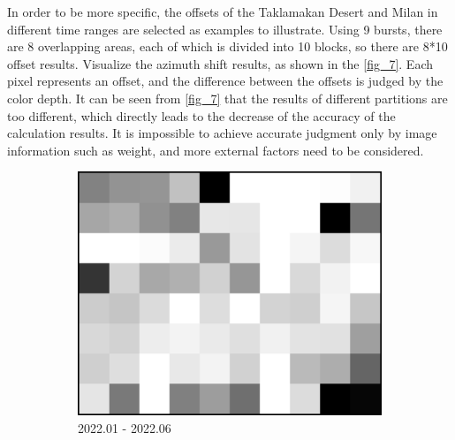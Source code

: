 \documentclass[preprint, authoryear]{elsarticle}
\begin{document}
In order to be more specific, the offsets of the Taklamakan Desert and Milan in different time ranges are selected as examples to illustrate. Using 9 bursts, there are 8 overlapping areas, each of which is divided into 10 blocks, so there are 8*10 offset results. Visualize the azimuth shift results, as shown in the \ref{fig_7}. Each pixel represents an offset, and the difference between the offsets is judged by the color depth. It can be seen from \ref{fig_7} that the results of different partitions are too different, which directly leads to the decrease of the accuracy of the calculation results. It is impossible to achieve accurate judgment only by image information such as weight, and more external factors need to be considered. \par

\begin{figure}
    \centering
    \begin{subfigure}{0.3\textwidth}
        \centering
        \includegraphics[width=\textwidth]{figure/The azimuth shift/shift_Milan_asc_20220626.png}
        \caption{2022.01 - 2022.06}
        \label{fig_7a}
    \end{subfigure}
    \begin{subfigure}{0.3\textwidth}
        \centering

\end{subfigure}
\end{figure}
\end{document}
